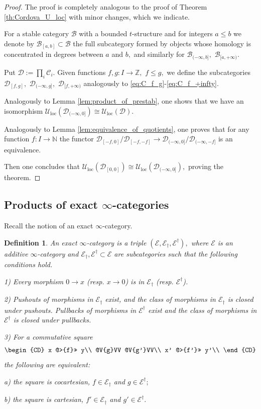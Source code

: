 \documentclass[11pt,leqno]{amsart}
\newtheorem{defi}[theo]{Definition}
\numberwithin{equation}{section}
\def\N{\mathbb{N}}
\def\Z{\mathbb{Z}}
\newcommand{\loc}{\operatorname{loc}}
\newcommand{\cD}{{\mathcal D}}
\newcommand{\cB}{{\mathcal B}}
\newcommand{\cC}{{\mathcal C}}
\newcommand{\cE}{{\mathcal E}}
\newcommand{\cU}{{\mathcal U}}
\begin{document}
\begin{proof}The proof is completely analogous to the proof of Theorem \ref{th:Cordova_U_loc} with minor changes, which we indicate.

For a stable category $\cB$ with a bounded $t$-structure and for integers $a\leq b$ we denote by $\cB_{[a,b]}\subset\cB$ the full subcategory formed by objects whose homology is concentrated in degrees between $a$ and $b,$ and similarly for $\cB_{(-\infty,b]},$ $\cB_{[a,+\infty)}.$

Put $\cD:=\prod\limits_i\cC_i.$ Given functions $f,g:I\to\Z,$ $f\leq g,$ we define the subcategories $\cD_{[f,g]},$ $\cD_{(-\infty,g]},$ $\cD_{[f,+\infty)}$ analogously to \eqref{eq:C_f_g}-\eqref{eq:C_f_+infty}.

Analogously to Lemma \ref{lem:product_of_prestab}, one shows that we have an isomorphism
$\cU_{\loc}(\cD_{(-\infty,0]})\cong \cU_{\loc}(\cD).$

Analogously to Lemma \ref{lem:equivalence_of_quotients}, one proves that for any function $f:I\to\N$ the functor $\cD_{[-f,0]}/\cD_{[-f,-f]}\to \cD_{(-\infty,0]}/\cD_{(-\infty,-f]}$ is an equivalence.

Then one concludes that $\cU_{\loc}(\cD_{[0,0]})\cong \cU_{\loc}(\cD_{(-\infty,0]}),$ proving the theorem.\end{proof}

\subsection{Products of exact $\infty$-categories}
\label{ssec:products_of_exact_cats}

Recall the notion of an exact $\infty$-category. 

\begin{defi}\cite[Definition 3.1]{Bar15} An exact $\infty$-category is a triple $(\cE,\cE_\dagger,\cE^\dagger),$ where $\cE$ is an additive $\infty$-category and $\cE_\dagger,\cE^\dagger\subset \cE$ are subcategories such that the following conditions hold.

1) Every morphism $0\to x$ (resp. $x\to 0$) is in $\cE_\dagger$ (resp. $\cE^\dagger$).

2) Pushouts of morphisms in $\cE_\dagger$ exist, and the class of morphisms in $\cE_\dagger$ is closed under pushouts. Pullbacks of morphisms in $\cE^\dagger$ exist and the class of morphisms in $\cE^\dagger$ is closed under pullbacks.

3) For a commutative square 
$$
\begin{CD}
x @>{f}>> y\\
@V{g}VV @V{g'}VV\\
x' @>{f'}>> y'\\
\end{CD}
$$
the following are equivalent:

a) the square is cocartesian, $f\in\cE_{\dagger}$ and $g\in\cE^\dagger;$

b) the square is cartesian, $f'\in\cE_\dagger$ and $g'\in\cE^\dagger.$\end{defi}
\end{document}
